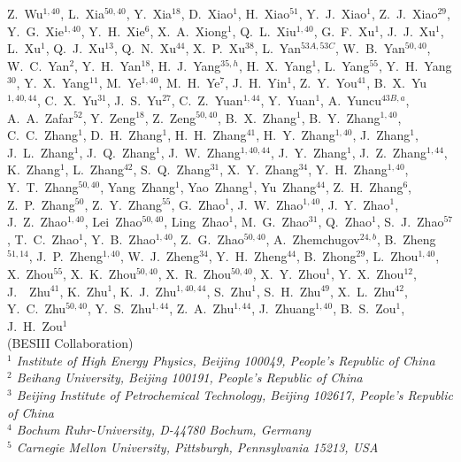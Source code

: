 \begin{small}
\begin{center}
Z.~Wu$^{1,40}$, L.~Xia$^{50,40}$, Y.~Xia$^{18}$, D.~Xiao$^{1}$, H.~Xiao$^{51}$, Y.~J.~Xiao$^{1}$, Z.~J.~Xiao$^{29}$, Y.~G.~Xie$^{1,40}$, Y.~H.~Xie$^{6}$, X.~A.~Xiong$^{1}$, Q.~L.~Xiu$^{1,40}$, G.~F.~Xu$^{1}$, J.~J.~Xu$^{1}$, L.~Xu$^{1}$, Q.~J.~Xu$^{13}$, Q.~N.~Xu$^{44}$, X.~P.~Xu$^{38}$, L.~Yan$^{53A,53C}$, W.~B.~Yan$^{50,40}$, W.~C.~Yan$^{2}$, Y.~H.~Yan$^{18}$, H.~J.~Yang$^{35,h}$, H.~X.~Yang$^{1}$, L.~Yang$^{55}$, Y.~H.~Yang$^{30}$, Y.~X.~Yang$^{11}$, M.~Ye$^{1,40}$, M.~H.~Ye$^{7}$, J.~H.~Yin$^{1}$, Z.~Y.~You$^{41}$, B.~X.~Yu$^{1,40,44}$, C.~X.~Yu$^{31}$, J.~S.~Yu$^{27}$, C.~Z.~Yuan$^{1,44}$, Y.~Yuan$^{1}$, A.~Yuncu$^{43B,a}$, A.~A.~Zafar$^{52}$, Y.~Zeng$^{18}$, Z.~Zeng$^{50,40}$, B.~X.~Zhang$^{1}$, B.~Y.~Zhang$^{1,40}$, C.~C.~Zhang$^{1}$, D.~H.~Zhang$^{1}$, H.~H.~Zhang$^{41}$, H.~Y.~Zhang$^{1,40}$, J.~Zhang$^{1}$, J.~L.~Zhang$^{1}$, J.~Q.~Zhang$^{1}$, J.~W.~Zhang$^{1,40,44}$, J.~Y.~Zhang$^{1}$, J.~Z.~Zhang$^{1,44}$, K.~Zhang$^{1}$, L.~Zhang$^{42}$, S.~Q.~Zhang$^{31}$, X.~Y.~Zhang$^{34}$, Y.~H.~Zhang$^{1,40}$, Y.~T.~Zhang$^{50,40}$, Yang~Zhang$^{1}$, Yao~Zhang$^{1}$, Yu~Zhang$^{44}$, Z.~H.~Zhang$^{6}$, Z.~P.~Zhang$^{50}$, Z.~Y.~Zhang$^{55}$, G.~Zhao$^{1}$, J.~W.~Zhao$^{1,40}$, J.~Y.~Zhao$^{1}$, J.~Z.~Zhao$^{1,40}$, Lei~Zhao$^{50,40}$, Ling~Zhao$^{1}$, M.~G.~Zhao$^{31}$, Q.~Zhao$^{1}$, S.~J.~Zhao$^{57}$, T.~C.~Zhao$^{1}$, Y.~B.~Zhao$^{1,40}$, Z.~G.~Zhao$^{50,40}$, A.~Zhemchugov$^{24,b}$, B.~Zheng$^{51,14}$, J.~P.~Zheng$^{1,40}$, W.~J.~Zheng$^{34}$, Y.~H.~Zheng$^{44}$, B.~Zhong$^{29}$, L.~Zhou$^{1,40}$, X.~Zhou$^{55}$, X.~K.~Zhou$^{50,40}$, X.~R.~Zhou$^{50,40}$, X.~Y.~Zhou$^{1}$, Y.~X.~Zhou$^{12}$, J.~~Zhu$^{41}$, K.~Zhu$^{1}$, K.~J.~Zhu$^{1,40,44}$, S.~Zhu$^{1}$, S.~H.~Zhu$^{49}$, X.~L.~Zhu$^{42}$, Y.~C.~Zhu$^{50,40}$, Y.~S.~Zhu$^{1,44}$, Z.~A.~Zhu$^{1,44}$, J.~Zhuang$^{1,40}$, B.~S.~Zou$^{1}$, J.~H.~Zou$^{1}$
\\
\vspace{0.2cm}
(BESIII Collaboration)\\
\vspace{0.2cm} {\it
$^{1}$ Institute of High Energy Physics, Beijing 100049, People's Republic of China\\
$^{2}$ Beihang University, Beijing 100191, People's Republic of China\\
$^{3}$ Beijing Institute of Petrochemical Technology, Beijing 102617, People's Republic of China\\
$^{4}$ Bochum Ruhr-University, D-44780 Bochum, Germany\\
$^{5}$ Carnegie Mellon University, Pittsburgh, Pennsylvania 15213, USA\\
}
\end{center}
\end{small}
